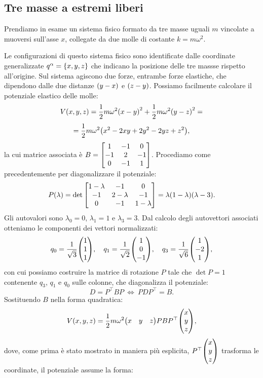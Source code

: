     \subsection{Tre masse a estremi liberi}
        Prendiamo in esame un sistema fisico formato da tre masse uguali $m$ vincolate a muoversi sull'asse $x$, collegate da due molle di costante $k=m\omega^2$. \par Le configurazioni di questo sistema fisico sono identificate dalle coordinate generalizzate $q^\alpha=\qty{x,y,z}$ che indicano la posizione delle tre massse rispetto all'origine. Sul sistema agiscono due forze, entrambe forze elastiche, che dipendono dalle due distanze $\qty(y-x)$ e $\qty(z-y)$. Possiamo facilmente calcolare il potenziale elastico delle molle:
            $$V\qty(x,y,z)=\frac{1}{2}m\omega^2\qty(x-y)^2+\frac{1}{2}m\omega^2\qty(y-z)^2=$$
            $$=\frac{1}{2}m\omega^2\qty(x^2-2xy+2y^2-2yz+z^2),$$
        la cui matrice associata \`e $\displaystyle B=\mqty[1 & -1 & 0 \\ -1 & 2 & -1 \\ 0 & -1 & 1]$. Procediamo come precedentemente per diagonalizzare il potenziale: $$P\qty(\lambda)=\det\mqty[1-\lambda & -1 & 0 \\ -1 & 2-\lambda & -1 \\ 0 & -1 & 1-\lambda]=\lambda\qty(1-\lambda)\qty(\lambda-3).$$ Gli autovalori sono $\lambda_0=0$, $\lambda_1=1$ e $\lambda_3=3$. Dal calcolo degli autovettori associati otteniamo le componenti dei vettori normalizzati:
            $$q_0=\frac{1}{\sqrt{3}}\mqty(1 \\ 1 \\ 1),\quad q_1=\frac{1}{\sqrt{2}}\mqty(1 \\ 0 \\ -1),\quad q_3=\frac{1}{\sqrt{6}}\mqty(1 \\ -2 \\ 1),$$
        con cui possiamo costruire la matrice di rotazione $P$ tale che $\det P=1$ contenente $q_3$, $q_1$ e $q_0$ sulle colonne, che diagonalizza il potenziale:
            $$D=P^\top BP\ \iff\ PDP^\top=B.$$
        Sostituendo $B$ nella forma quadratica:
            $$V\qty(x,y,z)=\frac{1}{2}m\omega^2\mqty(x & y & z)PBP^\top\mqty(x\\y\\z),$$
        dove, come prima \`e stato mostrato in maniera pi\`u esplicita, $P^\top\mqty(x\\y\\z)$ trasforma le coordinate, il potenziale assume la forma:

